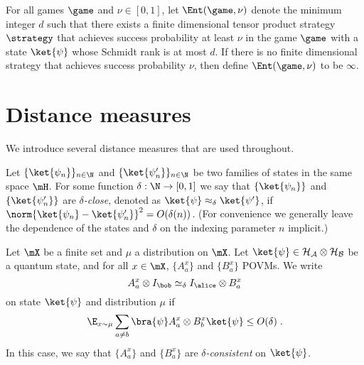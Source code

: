 \begin{definition}
\hypertarget{000J}{}
\reversemarginpar{}
  \label{def:ent}
	For all games $\game$ and $\nu \in [0, 1]$, let $\Ent(\game, \nu)$ denote the
  minimum integer $d$ such that there exists a finite dimensional tensor product
  strategy $\strategy$ that achieves success probability at least $\nu$ in the
  game $\game$ with a state $\ket{\psi}$ whose Schmidt rank is at most $d$.
  If there is no finite dimensional strategy that achieves success probability
  $\nu$, then define $\Ent(\game, \nu)$ to be $\infty$.
\end{definition}

\hypertarget{000K}{}
\reversemarginpar{}
\section{Distance measures}
\label{section-distancemeasures}

We introduce several distance measures that are used throughout.

\begin{definition}
\hypertarget{000L}{}
\reversemarginpar{}
  \label{def:state-distance}

	Let $\{\ket{\psi_n}\}_{n\in \N}$ and $\{\ket{\psi'_n}\}_{n\in \N}$ be two
  families of states in the same space $\mH$.
  For some function $\delta : \N \to [0,1]$ we say that $\{ \ket{\psi_n} \}$ and
  $\{ \ket{\psi'_n} \}$ are \emph{$\delta$-close}, denoted as $\ket{\psi}
  \approx_\delta \ket{\psi'}$, if $ \norm{\ket{\psi_n} - \ket{\psi'_n}}^2 =
  O(\delta(n))$.
  (For convenience we generally leave the dependence of the states and $\delta$
  on the indexing parameter $n$ implicit.)
\end{definition}

\begin{definition}
\hypertarget{000M}{}
\reversemarginpar{}
  \label{def:consistency}
	Let $\mX$ be a finite set and $\mu$ a distribution on $\mX$.
  Let $\ket{\psi} \in \cal{H}_A \otimes \cal{H}_B$ be a quantum state, and for
  all $x\in \mX$, $\{A^x_a\}$ and $\{B^x_a\}$ POVMs.
  We write
  \begin{equation*}
    A^x_a \otimes I_\bob \simeq_\delta I_\alice \otimes B^x_a
  \end{equation*}
  on state $\ket{\psi}$ and distribution $\mu$ if
  \begin{equation*}
    \E_{x\sim \mu} \sum_{a\ne b} \bra{\psi} A^x_a \otimes B^x_b \ket{\psi}
    \leq O(\delta)\;.
  \end{equation*}
  In this case, we say that $\{A^x_a\}$ and $\{B^x_a\}$ are
  \emph{$\delta$-consistent} on $\ket{\psi}$.
\end{definition}


